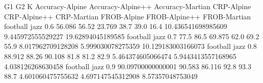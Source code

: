 G1 G2 K Accuracy-Alpine Accuracy-Alpine++ Accuracy-Martian CRP-Alpine CRP-Alpine++ CRP-Martian FROB-Alpine FROB-Alpine++ FROB-Martian
football jazz 0.6 56.086 56.52 23.769 38.7 39.0 16.4 10.436541698985609 9.445972555529227 19.62894045189585
football jazz 0.7 77.5 86.5 69.875 62.0 69.2 55.9 8.017962709128208 5.999030078275359 10.129183003166073
football jazz 0.8 88.912 88.26 90.108 81.8 81.2 82.9 5.464374605066474 5.9443413557168965 4.038126268630458
football jazz 0.9 90.09700000000001 90.583 86.116 92.8 93.3 88.7 4.601060475755632 4.697147545312908 8.57357048753049
